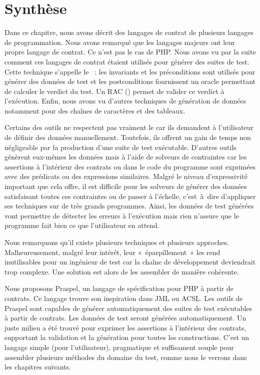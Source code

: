 \section{Synthèse}
\label{section:sota:summary}

Dans ce chapitre, nous avons décrit des langages de contrat de plusieurs
langages de programmation. Nous avons remarqué que les langages majeurs ont leur
propre langage de contrat. Ce n'est pas le cas de PHP. Nous avons vu par la
suite comment ces langages de contrat étaient utilisés pour générer des suites
de test. Cette technique s'appelle le ~: les
invariants et les préconditions sont utilisés pour générer des données de test
et les postconditions fournissent un oracle permettant de calculer le verdict du
test. Un RAC () permet de valider ce
verdict à l'exécution. Enfin, nous avons vu d'autres techniques de génération de
données notamment pour des chaînes de caractères et des tableaux.

Certains des outils ne respectent pas vraiment le  car ils demandent à l'utilisateur de définir des données manuellement.
Toutefois, ils offrent un gain de temps non négligeable par la production d'une
suite de test exécutable. D'autres outils génèrent eux-mêmes les données mais à
l'aide de solveurs de contraintes car les assertions à l'intérieur des contrats
ou dans le code du programme sont exprimées avec des prédicats ou des
expressions similaires. Malgré le niveau d'expressivité important que cela
offre, il est difficile pour les solveurs de générer des données satisfaisant
toutes ces contraintes ou de passer à l'échelle, c'est~à~dire d'appliquer ses
techniques sur de très grands programmes. Ainsi, les données de test générées
vont permettre de détecter les erreurs à l'exécution mais rien n'assure que le
programme fait bien ce que l'utilisateur en attend.

Nous remarquons qu'il existe plusieurs techniques et plusieurs approches.
Malheureusement, malgré leur intérêt, leur «~éparpillement~» les rend
inutilisables pour un ingénieur de test car la chaîne de développement
deviendrait trop complexe. Une solution est alors de les assembler de manière
cohérente.

Nous proposons Praspel, un langage de spécification pour PHP à partir de
contrats. Ce langage trouve son inspiration dans JML ou ACSL. Les outils de
Praspel sont capables de générer automatiquement des suites de test exécutables
à partir de contrats. Les données de test seront générées automatiquement. Un
juste milieu a été trouvé pour exprimer les assertions à l'intérieur des
contrats, supportant la validation et la génération pour toutes les
constructions. C'est un langage simple (pour l'utilisateur), pragmatique et
suffisament souple pour assembler plusieurs méthodes du domaine du test, comme
nous le verrons dans les chapitres suivants.
